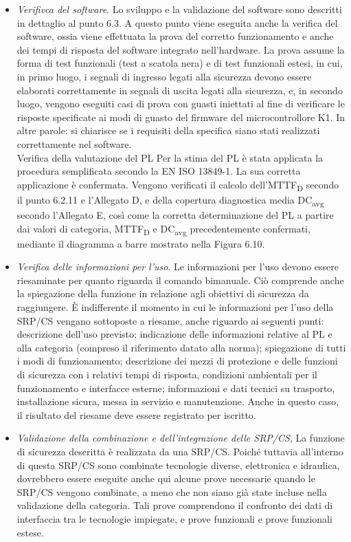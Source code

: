 \begin{itemize}
    \item \textit{Verifivca del software}. Lo sviluppo e la validazione del software sono descritti in dettaglio al punto 6.3. A questo punto viene eseguita anche la verifica del software, ossia viene effettuata la prova del corretto funzionamento e anche dei tempi di risposta del software integrato nell'hardware. La prova assume la forma di test funzionali (test a scatola nera) e di test funzionali estesi, in cui, in primo luogo, i segnali di ingresso legati alla sicurezza devono essere elaborati correttamente in segnali di uscita legati alla sicurezza, e, in secondo luogo, vengono eseguiti casi di prova con guasti iniettati al fine di verificare le risposte specificate ai modi di guasto del firmware del microcontrollore K1. In altre parole: si chiarisce se i requisiti della specifica siano stati realizzati correttamente nel software.\\
    Verifica della valutazione del PL
    Per la stima del PL è stata applicata la procedura semplificata secondo la EN ISO 13849-1. La sua corretta applicazione è confermata. Vengono verificati il calcolo dell'MTTF\textsubscript{D} secondo il punto 6.2.11 e l'Allegato D, e della copertura diagnostica media DC\textsubscript{avg} secondo l'Allegato E, così come la corretta determinazione del PL a partire dai valori di categoria, MTTF\textsubscript{D} e DC\textsubscript{avg} precedentemente confermati, mediante il diagramma a barre mostrato nella Figura 6.10.
    \item \textit{Verifica delle informazioni per l'uso}. Le informazioni per l'uso devono essere riesaminate per quanto riguarda il comando bimanuale. Ciò comprende anche la spiegazione della funzione in relazione agli obiettivi di sicurezza da raggiungere. È indifferente il momento in cui le informazioni per l'uso della SRP/CS vengano sottoposte a riesame, anche riguardo ai seguenti punti: descrizione dell'uso previsto; indicazione delle informazioni relative al PL e alla categoria (compreso il riferimento datato alla norma); spiegazione di tutti i modi di funzionamento; descrizione dei mezzi di protezione e delle funzioni di sicurezza con i relativi tempi di risposta, condizioni ambientali per il funzionamento e interfacce esterne; informazioni e dati tecnici su trasporto, installazione sicura, messa in servizio e manutenzione. Anche in questo caso, il risultato del riesame deve essere registrato per iscritto.
    \item \textit{Validazione della combinazione e dell'integrazione delle SRP/CS}, La funzione di sicurezza descritta è realizzata da una SRP/CS. Poiché tuttavia all'interno di questa SRP/CS sono combinate tecnologie diverse, elettronica e idraulica, dovrebbero essere eseguite anche qui alcune prove necessarie quando le SRP/CS vengono combinate, a meno che non siano già state incluse nella validazione della categoria. Tali prove comprendono il confronto dei dati di interfaccia tra le tecnologie impiegate, e prove funzionali e prove funzionali estese.
\end{itemize}

